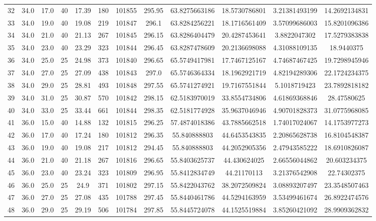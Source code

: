 \begin{table}[H]
\begin{center}
\begin{tabular}{|cccccccccccc|}
	32 & 34.0 & 17.0 & 40 & 17.39 & 180 & 101855 & 295.95 & 63.8275663186 & 18.5730786801 & 3.21381493199 & 14.2692134831\\
	33 & 34.0 & 19.0 & 40 & 19.08 & 219 & 101847 & 296.1 & 63.8284256221 & 18.1716561409 & 3.57099686003 & 15.8201096386\\
	34 & 34.0 & 21.0 & 40 & 21.13 & 267 & 101845 & 296.15 & 63.8286404479 & 20.4287453641 & 3.8822047302 & 17.5279383838\\
	35 & 34.0 & 23.0 & 40 & 23.29 & 323 & 101844 & 296.45 & 63.8287478609 & 20.2136698088 & 4.31088109135 & 18.9440375\\
	36 & 34.0 & 25.0 & 25 & 24.98 & 373 & 101840 & 296.65 & 65.5749417981 & 17.7467125167 & 4.74687467425 & 19.7298945946\\
	37 & 34.0 & 27.0 & 25 & 27.09 & 438 & 101843 & 297.0 & 65.5746364334 & 18.1962921719 & 4.82194289306 & 22.1724234375\\
	38 & 34.0 & 29.0 & 25 & 28.81 & 493 & 101848 & 297.55 & 65.5741274921 & 19.7167551844 & 5.1018719423 & 23.7892818182\\
	39 & 34.0 & 31.0 & 25 & 30.87 & 570 & 101842 & 298.15 & 62.5183970019 & 33.8554734806 & 4.61869368846 & 28.47580625\\
	40 & 34.0 & 33.0 & 25 & 33.44 & 661 & 101844 & 298.35 & 62.5181774928 & 35.9637046946 & 4.90701828373 & 31.0775968085\\
	41 & 36.0 & 15.0 & 40 & 14.88 & 132 & 101815 & 296.25 & 57.4874018386 & 43.7885662518 & 1.74017024067 & 14.1753977273\\
	42 & 36.0 & 17.0 & 40 & 17.24 & 180 & 101812 & 296.35 & 55.840888803 & 44.6453543835 & 2.20865628738 & 16.8104548387\\
	43 & 36.0 & 19.0 & 40 & 19.08 & 217 & 101812 & 294.45 & 55.840888803 & 44.2052905356 & 2.47943585222 & 18.6910826087\\
	44 & 36.0 & 21.0 & 40 & 21.18 & 267 & 101816 & 296.65 & 55.8403625737 & 44.430624025 & 2.66556044862 & 20.603234375\\
	45 & 36.0 & 23.0 & 40 & 23.24 & 323 & 101809 & 296.95 & 55.8412834749 & 44.21170113 & 3.21376542908 & 22.74302375\\
	46 & 36.0 & 25.0 & 25 & 24.9 & 371 & 101802 & 297.15 & 55.8422043762 & 38.2072509824 & 3.08893207497 & 23.3548507463\\
	47 & 36.0 & 27.0 & 25 & 27.08 & 435 & 101788 & 297.45 & 55.8440461786 & 44.5294163959 & 3.53499461674 & 26.8922474576\\
	48 & 36.0 & 29.0 & 25 & 29.19 & 506 & 101784 & 297.85 & 55.8445724078 & 44.1525519884 & 3.85260421092 & 28.9909362832\\

\end{tabular}
\end{center}
\end{table}
